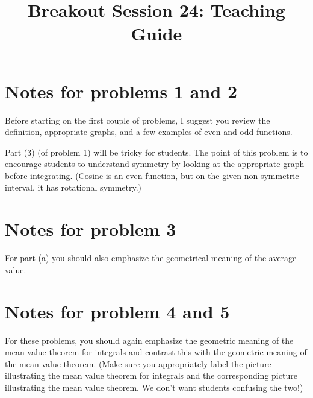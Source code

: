 \documentclass[handout, nooutcomes]{ximera}
\title{Breakout Session 24: Teaching Guide}
\begin{document}
\begin{abstract}

\end{abstract}
\maketitle

\section{Notes for problems 1 and 2}
Before starting on the first couple of problems, I suggest you review the definition, appropriate graphs, and a few examples of even and odd functions.

Part (3) (of problem 1) will be tricky for students.
The point of this problem is to encourage students to understand symmetry by looking at the appropriate graph before integrating.
(Cosine is an even function, but on the given non-symmetric interval, it has rotational symmetry.)

\section{Notes for problem 3}
For part (a) you should also emphasize the geometrical meaning of the average value.

\section{Notes for problem 4 and 5}
For these problems, you should again emphasize the geometric meaning of the mean value theorem for integrals and contrast this with the geometric meaning of the mean value theorem.
(Make sure you appropriately label the picture illustrating the mean value theorem for integrals and the corresponding picture illustrating the mean value theorem.
We don’t want students confusing the two!)
\end{document}
